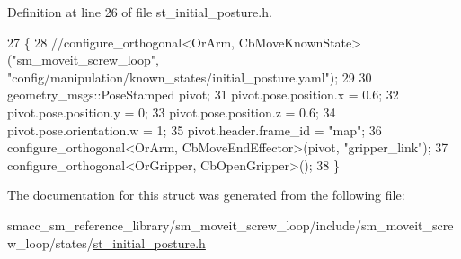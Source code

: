 Definition at line 26 of file st\+\_\+initial\+\_\+posture.\+h.


\begin{DoxyCode}
27         \{
28             \textcolor{comment}{//configure\_orthogonal<OrArm, CbMoveKnownState>("sm\_moveit\_screw\_loop",
       "config/manipulation/known\_states/initial\_posture.yaml");}
29 
30             geometry\_msgs::PoseStamped pivot;
31             pivot.pose.position.x = 0.6;
32             pivot.pose.position.y = 0;
33             pivot.pose.position.z = 0.6;
34             pivot.pose.orientation.w = 1;
35             pivot.header.frame\_id = \textcolor{stringliteral}{"map"};
36             configure\_orthogonal<OrArm, CbMoveEndEffector>(pivot, \textcolor{stringliteral}{"gripper\_link"});
37             configure\_orthogonal<OrGripper, CbOpenGripper>();
38         \}
\end{DoxyCode}


The documentation for this struct was generated from the following file\+:\begin{DoxyCompactItemize}
\item 
smacc\+\_\+sm\+\_\+reference\+\_\+library/sm\+\_\+moveit\+\_\+screw\+\_\+loop/include/sm\+\_\+moveit\+\_\+screw\+\_\+loop/states/\hyperlink{sm__moveit__screw__loop_2include_2sm__moveit__screw__loop_2states_2st__initial__posture_8h}{st\+\_\+initial\+\_\+posture.\+h}\end{DoxyCompactItemize}
